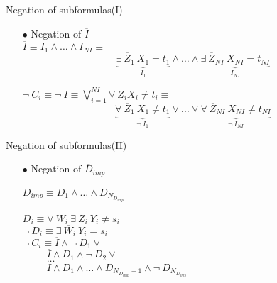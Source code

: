 \documentclass[pdf,slideColor,contemporain]{prosper}
\begin{document}
\begin{slide}{Negation of subformulas(I)}
     \begin{itemize}
        \item[{\blue$\bullet$}] Negation of $\overline{I}$ \\
\vspace{0.5cm}
$\overline{I} \equiv I_1 \wedge \ldots \wedge I_{NI} \equiv$
\[ \underbrace{\exists~ \overline{Z}_1~ X_1 = t_1 } _{I_1} \wedge \ldots \wedge   \underbrace{\exists~ \overline{Z}_{NI}~ X_{NI} = t_{NI} } _{I_{NI}} \]
{\blue

$ \neg ~ C_i \equiv \neg~ \overline{I} \equiv \bigvee_{i=1}^{NI} \forall~ \overline{Z}_i X_i
           \neq t_i \equiv $
\[ \underbrace{\forall~ \overline{Z}_1~ X_1 \neq t_1} _{\neg~
           I_1} \vee \ldots \vee \underbrace{\forall~
           \overline{Z}_{NI}~ X_{NI} \neq t_{NI} } _{\neg~ I_{NI}} \] 
}
     \end{itemize}
\end{slide}

\begin{slide}{Negation of subformulas(II)}
     \begin{itemize}
        \item[{\blue$\bullet$}] Negation of $\overline{D}_{imp}$ \\
\vspace{0.2cm}

$\overline{D}_{imp} \equiv D_1
           \wedge \ldots \wedge D_{N_{D_{imp}}}$ \\
\vspace{0.1cm}

$ D_i \equiv
           \forall~ \overline{W}_i ~ \exists~ \overline{Z}_i ~ Y_i
           \neq s_i$ \\
\vspace{0.1cm}
$ \neg~ D_i \equiv \exists~
           \overline{W}_i~ Y_i = s_i$ \\
\vspace{0.3cm}
{\blue
           $ \neg ~ C_i \equiv \overline{I} \wedge \neg~ D_1  \vee$ \\ 
           $~~~~~~~~~~~ \overline{I} \wedge
           D_1 \wedge \neg~ D_2  \vee$ \\ 
           $~~~~~~~~~~~\ldots $ \\ 
           $~~~~~~~~~~~\overline{I} \wedge
           D_1 \wedge \ldots \wedge D_{N_{D_{imp}}-1} \wedge \neg~
           D_{N_{D_{imp}}}$ \\ 
}
     \end{itemize}
\end{slide}
\end{document}

